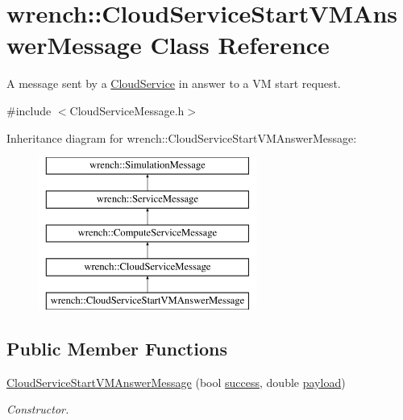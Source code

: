 \hypertarget{classwrench_1_1_cloud_service_start_v_m_answer_message}{}\section{wrench\+:\+:Cloud\+Service\+Start\+V\+M\+Answer\+Message Class Reference}
\label{classwrench_1_1_cloud_service_start_v_m_answer_message}


A message sent by a \hyperlink{classwrench_1_1_cloud_service}{Cloud\+Service} in answer to a VM start request.  




{\ttfamily \#include $<$Cloud\+Service\+Message.\+h$>$}

Inheritance diagram for wrench\+:\+:Cloud\+Service\+Start\+V\+M\+Answer\+Message\+:\begin{figure}[H]
\begin{center}
\leavevmode
\includegraphics[height=5.000000cm]{classwrench_1_1_cloud_service_start_v_m_answer_message}
\end{center}
\end{figure}
\subsection*{Public Member Functions}
\begin{DoxyCompactItemize}
\item 
\hyperlink{classwrench_1_1_cloud_service_start_v_m_answer_message_abdd9a5d9c840ea52c927350b2cba03f6}{Cloud\+Service\+Start\+V\+M\+Answer\+Message} (bool \hyperlink{classwrench_1_1_cloud_service_start_v_m_answer_message_a210f9d0e1ede709fe81b2f3b9a2ce62d}{success}, double \hyperlink{classwrench_1_1_simulation_message_a914f2732713f7c02898e66f05a7cb8a1}{payload})
\begin{DoxyCompactList}\small\item\em Constructor. \end{DoxyCompactList}\end{DoxyCompactItemize}
